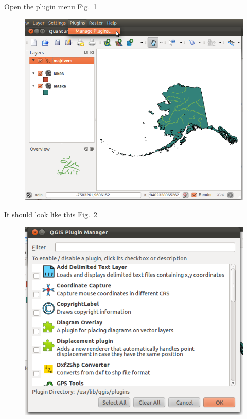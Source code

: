 Open the plugin menu Fig.~\ref{fig:qgis008}

\begin{figure}[htbp]
   \centering
   \includegraphics[scale=0.35]{qgis008.png}
   \caption{}
   \label{fig:qgis008}
\end{figure}

It should look like this Fig.~\ref{fig:qgis009}

\begin{figure}[htbp]
   \centering
   \includegraphics[scale=0.35]{qgis009.png}
   \caption{}
   \label{fig:qgis009}
\end{figure}

